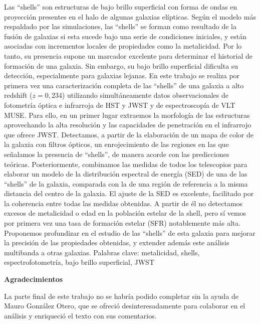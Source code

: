 \documentclass[12pt,a4paper,twoside,pdf]{article}
\numberwithin{equation}{section}
\begin{document}
\begin{center}
\begin{minipage}{0.8\linewidth}
  Las \enquote{shells} son estructuras de bajo brillo superficial con forma de ondas en proyección presentes en el halo de algunas galaxias elípticas. Según el modelo más respaldado por las simulaciones, las \enquote{shells} se forman como resultado de la fusión de galaxias si esta sucede bajo una serie de condiciones iniciales, y están asociadas con incrementos locales de propiedades como la metalicidad. Por lo tanto, su presencia supone un marcador excelente para determinar el historial de formación de una galaxia. Sin embargo, su bajo brillo superficial dificulta su detección, especialmente para galaxias lejanas. En este trabajo se realiza por primera vez una caracterización completa de las \enquote{shells} de una galaxia a alto redshift (\(z = 0,234\)) utilizando simultáneamente datos observacionales de fotometría óptica e infrarroja de HST y JWST y de espectroscopía de VLT MUSE. Para ello, en un primer lugar extraemos la morfología de las estructuras aprovechando la alta resolución y las capacidades de penetración en el infrarrojo que ofrece JWST. Detectamos, a partir de la elaboración de un mapa de color de la galaxia con filtros ópticos, un enrojecimiento de las regiones en las que señalamos la presencia de \enquote{shells}, de manera acorde con las predicciones teóricas. Posteriormente, combinamos las medidas de todos los telescopios para elaborar un modelo de la distribución espectral de energía (SED) de una de las \enquote{shells} de la galaxia, comparada con la de una región de referencia a la misma distancia del centro de la galaxia. El ajuste de la SED es excelente, facilitado por la coherencia entre todas las medidas obtenidas. A partir de él no detectamos excesos de metalicidad o edad en la población estelar de la shell, pero sí vemos por primera vez una tasa de formación estelar (SFR) notablemente más alta. Proponemos profundizar en el estudio de las \enquote{shells} de esta galaxia para mejorar la precisión de las propiedades obtenidas, y extender además este análisis multibanda a otras galaxias. Palabras clave: metalicidad, shells, espectrofotometría, bajo brillo superficial, JWST

\end{minipage}

\bigskip

{\bf Agradecimientos}

\bigskip

\begin{minipage}{0.8\linewidth}
La parte final de este trabajo no se habría podido completar sin la ayuda de Mauro González Otero, que se ofreció desinteresadamente para colaborar en el análisis y enriqueció el texto con sus comentarios. 

\end{minipage}

\end{center}
\end{document}

